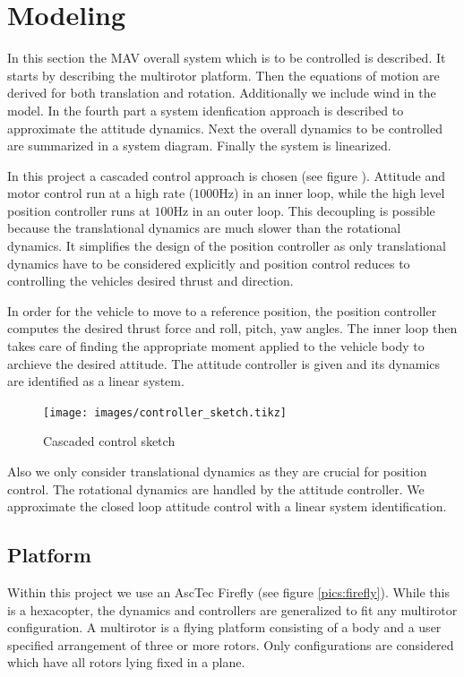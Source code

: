 \chapter{Modeling}
\label{sec:modeling}
In this section the MAV overall system which is to be controlled is described. It starts by describing the multirotor platform. Then the equations of motion are derived for both translation and rotation. Additionally we include wind in the model. In the fourth part a system idenfication approach is described to approximate the attitude dynamics. Next the overall dynamics to be controlled are summarized in a system diagram. Finally the system is linearized.

In this project a cascaded control approach is chosen (see figure ). Attitude and motor control run at a high rate ($1000 \si{\hertz}$) in an inner loop, while the high level position controller runs at $100 \si{\hertz}$ in an outer loop. This decoupling is possible because the translational dynamics are much slower than the rotational dynamics. It simplifies the design of the position controller as only translational dynamics have to be considered explicitly and position control reduces to controlling the vehicles desired thrust and direction. 

In order for the vehicle to move to a reference position, the position controller computes the desired thrust force and roll, pitch, yaw angles. The inner loop then takes care of finding the appropriate moment applied to the vehicle body to archieve the desired attitude. The attitude controller is given and its dynamics are identified as a linear system.

\begin{figure}
\centering
\texttt{[image: images/controller\_sketch.tikz]}
\caption{Cascaded control sketch}
\label{pics:controller_sketch}
\end{figure}





Also we only consider translational dynamics as they are crucial for position control. The rotational dynamics are handled by the attitude controller. We approximate the closed loop attitude control with a linear system identification.

\section{Platform}
Within this project we use an AscTec Firefly (see figure \ref{pics:firefly}). While this is a hexacopter, the dynamics and controllers are generalized to fit any multirotor configuration. A multirotor is a flying platform consisting of a body and a user specified arrangement of three or more rotors. Only configurations are considered which have all rotors lying fixed in a plane.

